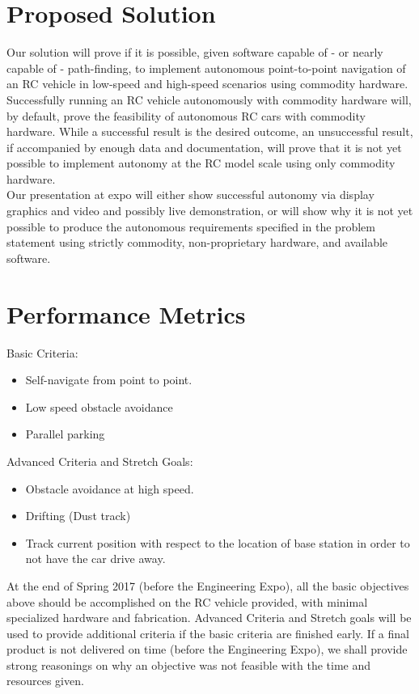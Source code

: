\documentclass[draftclsnofoot,onecolumn,10pt]{IEEEtran}
\begin{document}
\section{Proposed Solution}
Our solution will prove if it is possible, given software capable of - or nearly
capable of - path-finding, to implement autonomous point-to-point navigation of
an RC vehicle in low-speed and high-speed scenarios using commodity hardware.\\
Successfully running an RC vehicle autonomously with commodity hardware will, by
default, prove the feasibility of autonomous RC cars with commodity hardware.
While a successful result is the desired outcome, an unsuccessful result, if 
accompanied by enough data and documentation, will prove that it is not yet 
possible to implement autonomy at the RC model scale using only commodity hardware.\\
Our presentation at expo will either show successful autonomy via display 
graphics and video and possibly live demonstration, or will show why it is 
not yet possible to produce the autonomous requirements specified in the 
problem statement using strictly commodity, non-proprietary hardware, 
and available software.

\section{Performance Metrics}
Basic Criteria:
\begin{itemize}
	\item Self-navigate from point to point.
	\item Low speed obstacle avoidance
	\item Parallel parking
\end{itemize}
 Advanced Criteria and Stretch Goals:
 \begin{itemize}
	\item Obstacle avoidance at high speed.
	\item Drifting (Dust track) 
	\item Track current position with respect to the location of base station in order to not have the car drive away. 
\end{itemize}
At the end of Spring 2017 (before the Engineering Expo), all the basic objectives above should be accomplished on the RC vehicle provided, with minimal specialized hardware and fabrication. Advanced Criteria and Stretch goals will be used to provide additional criteria if the basic criteria are finished early. If a final product is not delivered on time (before the Engineering Expo), we shall provide strong reasonings on why an objective was not feasible with the time and resources given. 
\end{document}
